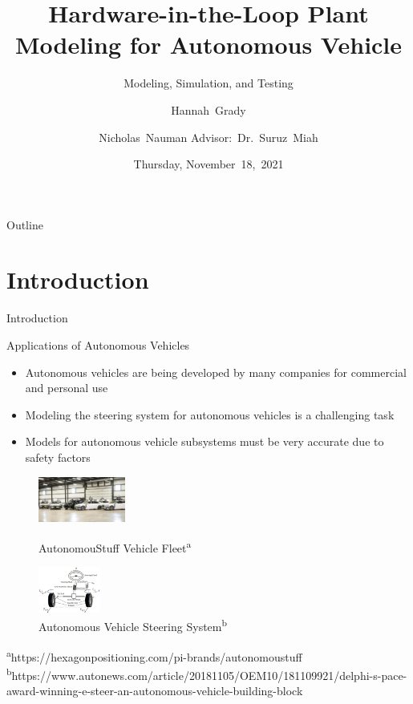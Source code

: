 \documentclass{beamer}
\title[HIL Plant Modeling]{Hardware-in-the-Loop Plant Modeling for Autonomous
  Vehicle}
\subtitle{Modeling, Simulation, and Testing}
\author[H.~Grady, N.~Nauman]{Hannah~Grady \and Nicholas~Nauman 
\linebreak Advisor:~Dr.~Suruz~Miah}
\institute[Bradley University] %
{
  Department of Electrical and Computer Engineering\\
  Bradley University\\
  1501 W. Bradley Avenue\\
  Peoria, IL, 61625, USA
}
\date[November~18,~2021]{Thursday, November~18,~2021}
\begin{document}
\begin{frame}
  \titlepage
\end{frame}

\begin{frame}{Outline} 
  \tableofcontents%
\end{frame}

\section{Introduction}

\begin{frame}{Introduction}{}
    \begin{block}{Applications of Autonomous Vehicles}
    	\begin{itemize}
    		\item Autonomous vehicles are being developed by many companies for commercial and personal use
    		\item Modeling the steering system for autonomous vehicles is a challenging task
     		\item Models for autonomous vehicle subsystems must be very accurate due to safety factors
		\end{itemize}
    \end{block}
        \begin{figure}
			\centering
			\begin{minipage}[t]{0.4\textwidth}
				\centering
				\includegraphics[height=1.5cm]{figs/img/autonomousVehiclesAStuff}
				\caption{AutonomouStuff Vehicle Fleet\textsuperscript{a}}
				\label{fig:fleet}
			\end{minipage}
			\begin{minipage}[t]{0.4\textwidth}
				\centering
				\includegraphics[height=1.5cm]{figs/img/autonomousVehiclesSteering}
				\caption{Autonomous Vehicle Steering System\textsuperscript{b}}
				\label{fig:steerSystem}
			\end{minipage}
        \end{figure}
    \begin{tiny}
		\textsuperscript{a}https://hexagonpositioning.com/pi-brands/autonomoustuff\\\textsuperscript{b}https://www.autonews.com/article/20181105/OEM10/181109921/delphi-s-pace-award-winning-e-steer-an-autonomous-vehicle-building-block
    \end{tiny}
\end{frame}
\end{document}
